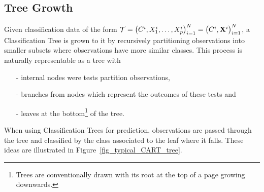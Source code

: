 \subsection{Tree Growth}
\label{TreeGrowth}
Given classification data of the form $\mathcal{T}=\left(C^i,X_1^i,\ldots,X_p^i\right)_{i=1}^N=\left(C^i,\mathbf{X}^i\right)_{i=1}^N$, a Classification Tree is grown to it by recursively partitioning observations into smaller subsets where observations have more similar classes. This process is naturally representable as a tree with
\begin{itemize}
\item[-] internal nodes were tests partition observations,
\item[-] branches from nodes which represent the outcomes of these tests and
\item[-] leaves at the bottom\footnote{Trees are conventionally drawn with its root at the top of a page growing downwards.} of the tree.
\end{itemize}
When using Classification Trees for prediction, observations are passed through the tree and classified by the class associated to the leaf where it falls. These ideas are illustrated in Figure~\ref{fig_typical_CART_tree}.

